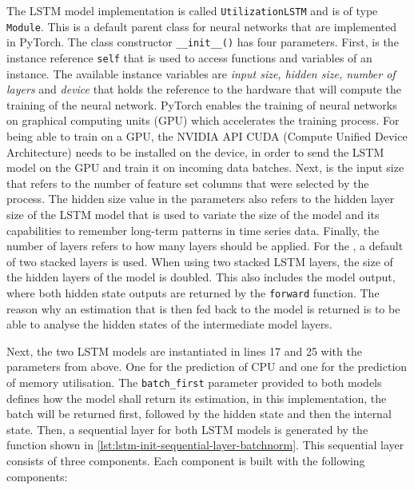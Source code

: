   The LSTM model implementation is called \texttt{UtilizationLSTM} and is of type \texttt{Module}. This is a default parent class for neural networks that are implemented in PyTorch.
  The class constructor \texttt{\_\_init\_\_()} has four parameters. First, is the instance reference \texttt{self} that is used to access functions and variables of an instance. 
  The available instance variables are \emph{input size, hidden size, number of layers} and \emph{device} that holds the reference to the hardware that will compute the training of the neural network.
  PyTorch enables the training of neural networks on graphical computing units (GPU) which accelerates the training process. For being able to train on a GPU, the NVIDIA API CUDA (Compute Unified Device Architecture) needs to be installed on the device, in order to send the LSTM model on the GPU and train it on incoming data batches. 
  Next, is the input size that refers to the number of feature set columns that were selected by the  process.
  The hidden size value in the parameters also refers to the hidden layer size of the LSTM model that is used to variate the size of the model and its capabilities to remember long-term patterns in time series data.
  Finally, the number of layers refers to how many  layers should be applied.
  For the , a default of two stacked layers is used. When using two stacked LSTM layers, the size of the hidden layers of the model is doubled. This also includes the model output, where both hidden state outputs are returned by the \texttt{forward} function.
  The reason why an estimation that is then fed back to the model is returned is to be able to analyse the hidden states of the intermediate model layers.
  
  Next, the two LSTM models are instantiated in lines 17 and 25 with the parameters from above. One for the prediction of CPU and one for the prediction of memory utilisation. The \texttt{batch\_first} parameter provided to both models defines how the model shall return its estimation, in this implementation, the batch will be returned first, followed by the hidden state and then the internal state.
  Then, a sequential layer for both LSTM models is generated by the function shown in \ref{lst:lstm-init-sequential-layer-batchnorm}. This sequential layer consists of three components. Each component is built with the following components:
  
